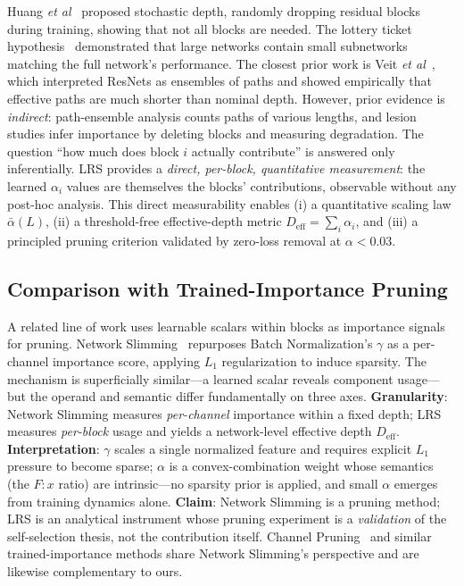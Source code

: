 \documentclass{bmvc2k}
\def\etal{\emph{et al}\bmvaOneDot}
\begin{document}
Huang \etal~\cite{huang2016deep} proposed stochastic depth, randomly dropping residual blocks during training, showing that not all blocks are needed. The lottery ticket hypothesis~\cite{frankle2019lottery} demonstrated that large networks contain small subnetworks matching the full network's performance. The closest prior work is Veit \etal~\cite{veit2016residual}, which interpreted ResNets as ensembles of paths and showed empirically that effective paths are much shorter than nominal depth. However, prior evidence is \emph{indirect}: path-ensemble analysis counts paths of various lengths, and lesion studies infer importance by deleting blocks and measuring degradation. The question ``how much does block $i$ actually contribute'' is answered only inferentially. LRS provides a \emph{direct, per-block, quantitative measurement}: the learned $\alpha_i$ values are themselves the blocks' contributions, observable without any post-hoc analysis. This direct measurability enables (i) a quantitative scaling law $\bar{\alpha}(L)$, (ii) a threshold-free effective-depth metric $D_\text{eff} = \sum_i \alpha_i$, and (iii) a principled pruning criterion validated by zero-loss removal at $\alpha < 0.03$.

\subsection{Comparison with Trained-Importance Pruning}

A related line of work uses learnable scalars within blocks as importance signals for pruning. Network Slimming~\cite{liu2017slimming} repurposes Batch Normalization's $\gamma$ as a per-channel importance score, applying $L_1$ regularization to induce sparsity. The mechanism is superficially similar---a learned scalar reveals component usage---but the operand and semantic differ fundamentally on three axes. \textbf{Granularity}: Network Slimming measures \emph{per-channel} importance within a fixed depth; LRS measures \emph{per-block} usage and yields a network-level effective depth $D_\text{eff}$. \textbf{Interpretation}: $\gamma$ scales a single normalized feature and requires explicit $L_1$ pressure to become sparse; $\alpha$ is a convex-combination weight whose semantics (the $F{:}x$ ratio) are intrinsic---no sparsity prior is applied, and small $\alpha$ emerges from training dynamics alone. \textbf{Claim}: Network Slimming is a pruning method; LRS is an analytical instrument whose pruning experiment is a \emph{validation} of the self-selection thesis, not the contribution itself. Channel Pruning~\cite{he2017channel} and similar trained-importance methods share Network Slimming's perspective and are likewise complementary to ours.
\end{document}
